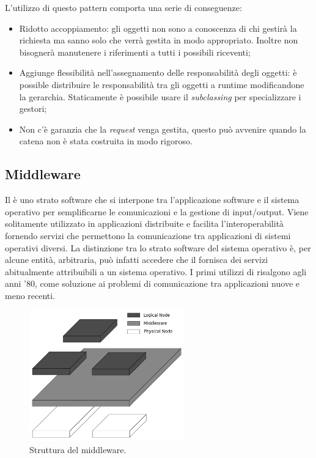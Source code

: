 	L'utilizzo di questo pattern comporta una serie di conseguenze:
		\begin{itemize}
			\item Ridotto accoppiamento: gli oggetti non sono a conoscenza di chi gestirà la richiesta ma sanno solo che verrà gestita in modo appropriato. Inoltre non bisognerà manutenere i riferimenti a tutti i possibili riceventi;
			\item Aggiunge flessibilità nell'assegnamento delle responsabilità degli oggetti: è possible distribuire le responsabilità tra gli oggetti a runtime modificandone la gerarchia. Staticamente è possibile usare il \emph{subclassing} per specializzare i gestori;
 			\item Non c'è garanzia che la \emph{request} venga gestita, questo può avvenire quando la catena non è stata costruita in modo rigoroso.
		\end{itemize}
	
		
		
		
	\pagebreak
	\subsection{Middleware} 
	Il  è uno strato software che si interpone tra l'applicazione software e il sistema operativo per semplificarne le comunicazioni e la gestione di input/output. Viene solitamente utilizzato in applicazioni distribuite e facilita l'interoperabilità fornendo servizi che permettono la comunicazione tra applicazioni di sistemi operativi diversi. La distinzione tra lo strato software del sistema operativo è, per alcune entità, arbitraria, può infatti accedere che il  fornisca dei servizi abitualmente attribuibili a un sistema operativo. I primi utilizzi di  risalgono agli anni '80, come soluzione ai problemi di comunicazione tra applicazioni nuove e meno recenti. 
	
	\begin{figure}[h]
	\centering \includegraphics[width=0.6\textwidth]{patterns/Middleware.png}
	\caption{Struttura del middleware.}
	\label{fig:middleware}
	\end{figure}
	
